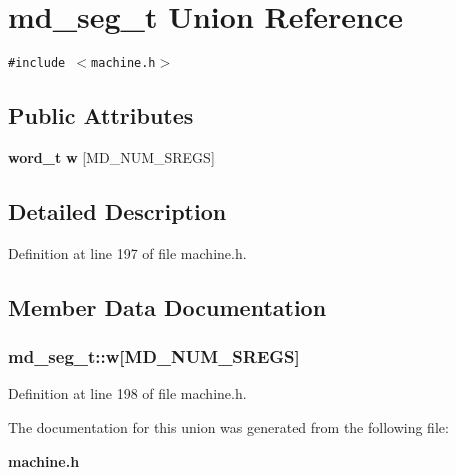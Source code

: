 \section{md\_\-seg\_\-t Union Reference}
\label{unionmd__seg__t}
{\tt \#include $<$machine.h$>$}

\subsection*{Public Attributes}
\begin{CompactItemize}
\item 
{\bf word\_\-t} {\bf w} [MD\_\-NUM\_\-SREGS]
\end{CompactItemize}


\subsection{Detailed Description}


Definition at line 197 of file machine.h.

\subsection{Member Data Documentation}
\subsubsection[{w}]{ {\bf md\_\-seg\_\-t::w}[MD\_\-NUM\_\-SREGS]}\label{unionmd__seg__t_3cfa90980f7dec4f9ae3a4bb5a9a88a8}




Definition at line 198 of file machine.h.

The documentation for this union was generated from the following file:\begin{CompactItemize}
\item 
{\bf machine.h}\end{CompactItemize}
